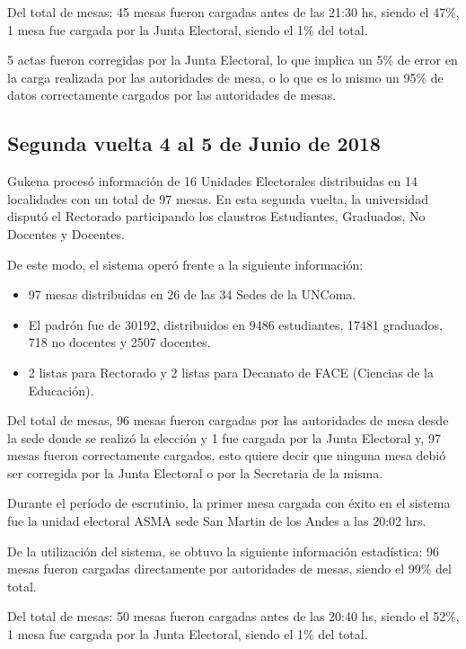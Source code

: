 Del total de mesas:
45 mesas fueron cargadas antes de las 21:30 hs, siendo el 47\%,
1 mesa fue cargada 	por la Junta Electoral, siendo el 1\% del total.

5 actas fueron corregidas por la Junta Electoral, lo que implica un 5\% de error en la carga realizada por las autoridades de mesa, o lo que es lo mismo un 95\% de datos correctamente cargados por las autoridades de mesas.

\subsection{Segunda vuelta 4 al 5 de Junio de 2018}
Gukena procesó información de 16 Unidades Electorales distribuidas en 14 localidades con un total de 97 mesas. En esta segunda vuelta, la universidad disputó el Rectorado participando los claustros Estudiantes, Graduados, No Docentes y Docentes.

De este modo, el sistema operó frente a la siguiente información:

\begin{itemize}
    \item 97 mesas distribuidas en 26 de las 34 Sedes de la UNComa.
     \item El padrón fue de  30192, distribuidos en 9486 estudiantes, 17481 graduados, 718 no docentes y 2507 docentes.
     \item 2 listas para Rectorado y 2 listas para Decanato de FACE (Ciencias de la Educación).
\end{itemize}
Del total de mesas, 96 mesas fueron cargadas por las autoridades de mesa desde la sede donde se realizó la elección y 1 fue cargada por la Junta Electoral y, 97 mesas fueron correctamente cargados, esto quiere decir que ninguna mesa debió ser corregida por la Junta Electoral o por la Secretaria de la misma.

Durante el período de escrutinio, la primer mesa cargada con éxito en el sistema fue la unidad electoral ASMA sede San Martin de los Andes a las 20:02 hrs.

De la utilización del sistema, se obtuvo la siguiente información estadística:
96 mesas fueron cargadas directamente por autoridades de mesas, siendo el 99\% del total.

Del total de mesas:
50 mesas fueron cargadas antes de las 20:40 hs, siendo el 52\%,
1 mesa fue cargada 	por la Junta Electoral, siendo el 1\% del total.

